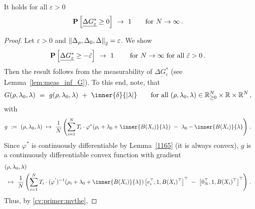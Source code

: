  \begin{lemma}
   \label{lem:conv_dG}
   \label{bw:cd:lem2}
   It holds
   for all $\varepsilon>0$
\begin{gather*}
   \P
   \left[ 
     \underline{
     \Delta G^*
     _\varepsilon
     }
     \ge 
     0
   \right]
   \ 
   \to
   \ 
   1
   \qquad
   \text{for}
   \ 
   N\to\infty
   \,.
\end{gather*}
 \end{lemma}
 \begin{proof}
   Let $\varepsilon>0$
   and 
   $\left\lVert
   \Delta_\rho,\Delta_0,\Delta
   \right\rVert_2=\varepsilon$.
   We show
\begin{gather*}
   \P
   \left[ 
     \underline{
     \Delta G^*
     _\varepsilon
     }
     \ge 
     -\tilde{\varepsilon}
   \right]
   \ 
   \to
   \ 
   1
   \qquad
   \ 
   \text{for}
   \ 
   N\to\infty
   \ 
   \text{for all}\ 
   \tilde{\varepsilon}>0
   \,.
\end{gather*}
Then the result follows from the measurability of 
$
     \underline{
     \Delta G^*
     _\varepsilon
     }
$
(see Lemma~\ref{lem:meas_inf_G}).
To this end, note, that
\begin{gather*}
  G(\rho,\lambda_0,\lambda)
  \ 
  =
  \ 
  g(\rho,\lambda_0,\lambda)
  \ 
  +
  \ 
  \inner{\delta}{|\lambda|}
  \qquad
  \text{for all}\ 
  (\rho,\lambda_0,\lambda)
  \in
  \R^N_{\ge 0}
  \times
  \R
  \times
  \R^{N}
  \,,
\end{gather*}
with
\begin{gather*}
  g
  \ 
  :=
  \ 
  (\rho,\lambda_0,\lambda)
  \ 
  \mapsto
  \ 
     \frac{1}{N}
     \left( 
\sum_{i=1} 
  ^N
  T_i
  \cdot
  \varphi^*
  \!
  \left( 
    \rho_i
    +
\lambda_0
+
\inner
{B(X_i)}
{
\lambda
}
  \right)
  \ 
  -
\ 
\lambda_0
-
\inner
{B(X_i)}
{
\lambda
}
     \right)
  \,.
\end{gather*}
Since $\varphi^*$ is continuously differentiable by Lemma~\ref{1165}
(it is always convex),
$g$ is a continuously differentiable convex function with gradient
\begin{align*}
  &
  (\rho,\lambda_0,\lambda)
  \\
  &
  \ 
  \mapsto
  \ 
     \frac{1}{N}
     \left( 
\sum_{i=1} 
  ^N
  T_i
  \cdot
  (
  \varphi^{'}
  )
  ^{-1}
  \!
  \left( 
    \rho_i
    +
\lambda_0
+
\inner
{B(X_i)}
{
\lambda
}
  \right)
  \left[ 
    e_i^\top,1,B(X_i)^\top
  \right]^\top
  \ 
  -
  \ 
  \left[ 
    0_N^\top,1,B(X_i)^\top
  \right]^\top
     \right)
  \,.
\end{align*}
Thus, by \eqref{cv:primer:mvthe},

\end{proof}
